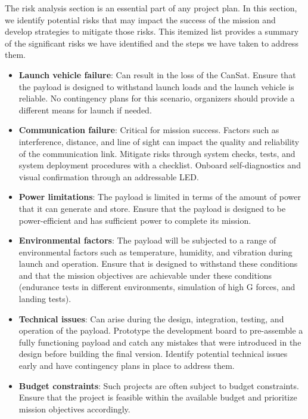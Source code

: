 
The risk analysis section is an essential part of any project plan. In this section, we identify potential risks that may impact the success of the mission and develop strategies to mitigate those risks. This itemized list provides a summary of the significant risks we have identified and the steps we have taken to address them.

\begin{itemize}[leftmargin=1cm, itemindent=0.25cm, noitemsep, topsep=0pt, label=$\bullet$]
\item \textbf{Launch vehicle failure}: Can result in the loss of the CanSat. Ensure that the payload is designed to withstand launch loads and the launch vehicle is reliable. No contingency plans for this scenario, organizers should provide a different means for launch if needed.
\item \textbf{Communication failure}: Critical for mission success. Factors such as interference, distance, and line of sight can impact the quality and reliability of the communication link. Mitigate risks through system checks, tests, and system deployment procedures with a checklist. Onboard self-diagnostics and visual confirmation through an addressable LED. 
\item \textbf{Power limitations}: The payload is limited in terms of the amount of power that it can generate and store. Ensure that the payload is designed to be power-efficient and has sufficient power to complete its mission. 
\item \textbf{Environmental factors}: The payload will be subjected to a range of environmental factors such as temperature, humidity, and vibration during launch and operation. Ensure that is designed to withstand these conditions and that the mission objectives are achievable under these conditions (endurance tests in different environments, simulation of high G forces, and landing tests).
\item \textbf{Technical issues}: Can arise during the design, integration, testing, and operation of the payload. Prototype the development board to pre-assemble a fully functioning payload and catch any mistakes that were introduced in the design before building the final version. Identify potential technical issues early and have contingency plans in place to address them. 
\item \textbf{Budget constraints}: Such projects are often subject to budget constraints. Ensure that the project is feasible within the available budget and prioritize mission objectives accordingly.
\end{itemize}

